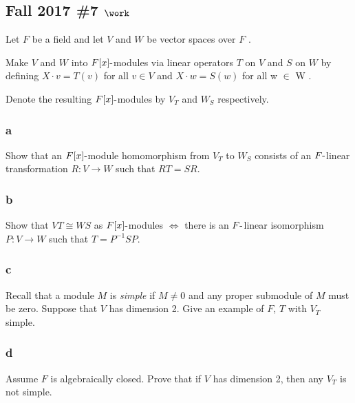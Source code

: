 \hypertarget{fall-2017-7-work}{%
\subsection{\texorpdfstring{Fall 2017 \#7
\(\work\)}{Fall 2017 \#7 \textbackslash work}}\label{fall-2017-7-work}}

Let \(F\) be a field and let \(V\) and \(W\) be vector spaces over \(F\)
.

Make \(V\) and \(W\) into \(F[x]{\hbox{-}}\)modules via linear operators
\(T\) on \(V\) and \(S\) on \(W\) by defining \(X \cdot v = T (v)\) for
all \(v \in V\) and \(X \cdot w = S(w)\) for all w \(\in\) W .

Denote the resulting \(F[x]{\hbox{-}}\)modules by \(V_T\) and \(W_S\)
respectively.

\hypertarget{a-96}{%
\subsubsection{a}\label{a-96}}

Show that an \(F[x]{\hbox{-}}\)module homomorphism from \(V_T\) to
\(W_S\) consists of an \(F{\hbox{-}}\)linear transformation
\(R : V \to W\) such that \(RT = SR\).

\hypertarget{b-86}{%
\subsubsection{b}\label{b-86}}

Show that \(VT \cong WS\) as \(F[x]{\hbox{-}}\)modules \(\iff\) there is
an \(F{\hbox{-}}\)linear isomorphism \(P : V \to W\) such that
\(T = P^{-1}SP\).

\hypertarget{c-56}{%
\subsubsection{c}\label{c-56}}

Recall that a module \(M\) is \emph{simple} if \(M \neq 0\) and any
proper submodule of \(M\) must be zero. Suppose that \(V\) has dimension
2. Give an example of \(F\), \(T\) with \(V_T\) simple.

\hypertarget{d-16}{%
\subsubsection{d}\label{d-16}}

Assume \(F\) is algebraically closed. Prove that if \(V\) has dimension
2, then any \(V_T\) is not simple.

